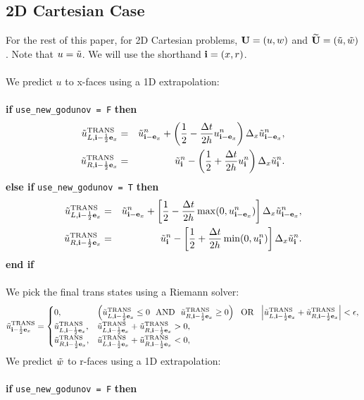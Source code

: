 \subsection{2D Cartesian Case}
For the rest of this paper, for 2D Cartesian problems, ${\bf U} = (u,w)$
and $\widetilde{{\bf U}} = (\tilde{u},\tilde{w})$.  Note that $u = \tilde{u}$.  We will use the 
shorthand ${\bf i} = (x,r)$.\\ \\
We predict $u$ to x-faces using a 1D extrapolation:\\ \\
{\bf if} {\tt use\_new\_godunov = F} {\bf then}
\begin{eqnarray}
\tilde{u}_{L,{\bf i}-\frac{1}{2}{\bf e}_x}^{\rm TRANS} &=& \tilde{u}_{{\bf i}-{\bf e}_x}^n + \left(\frac{1}{2} - \frac{\Delta t}{2h}u_{{\bf i}-{\bf e}_x}^n\right)\Delta_x \tilde{u}_{{\bf i}-{\bf e}_x}^n, \\
\tilde{u}_{R,{\bf i}-\frac{1}{2}{\bf e}_x}^{\rm TRANS} &=& \tilde{u}_{{\bf i}}^n - \left(\frac{1}{2} + \frac{\Delta t}{2h}u_{{\bf i}}^n\right)\Delta_x \tilde{u}_{{\bf i}}^n.
\end{eqnarray}
{\bf else if} {\tt use\_new\_godunov = T} {\bf then}
\begin{eqnarray}
\tilde{u}_{L,{\bf i}-\frac{1}{2}{\bf e}_x}^{\rm TRANS} &=& \tilde{u}_{{\bf i}-{\bf e}_x}^n + \left[\frac{1}{2} - \frac{\Delta t}{2h}\max(0,u_{{\bf i}-{\bf e}_x}^n)\right]\Delta_x \tilde{u}_{{\bf i}-{\bf e}_x}^n, \\
\tilde{u}_{R,{\bf i}-\frac{1}{2}{\bf e}_x}^{\rm TRANS} &=& \tilde{u}_{{\bf i}}^n - \left[\frac{1}{2} + \frac{\Delta t}{2h}\min(0,u_{{\bf i}}^n)\right]\Delta_x \tilde{u}_{{\bf i}}^n.
\end{eqnarray}
{\bf end if}\\ \\
We pick the final trans states using a Riemann solver:
\begin{equation}
\tilde{u}^{\rm TRANS}_{{\bf i}-\frac{1}{2}{\bf e}_x} =
\begin{cases}
0, & \left(\tilde{u}_{L,{\bf i}-\frac{1}{2}{\bf e}_x}^{\rm TRANS} \le 0 ~~ {\rm AND} ~~ \tilde{u}_{R,{\bf i}-\frac{1}{2}{\bf e}_x}^{\rm TRANS} \ge 0\right) ~~ {\rm OR} ~~ \left|\tilde{u}_{L,{\bf i}-\frac{1}{2}{\bf e}_x}^{\rm TRANS} + \tilde{u}_{R,{\bf i}-\frac{1}{2}{\bf e}_x}^{\rm TRANS}\right| < \epsilon, \\
\tilde{u}_{L,{\bf i}-\frac{1}{2}{\bf e}_x}^{\rm TRANS}, & \tilde{u}_{L,{\bf i}-\frac{1}{2}{\bf e}_x}^{\rm TRANS} + \tilde{u}_{R,{\bf i}-\frac{1}{2}{\bf e}_x}^{\rm TRANS} > 0, \\
\tilde{u}_{R,{\bf i}-\frac{1}{2}{\bf e}_x}^{\rm TRANS}, & \tilde{u}_{L,{\bf i}-\frac{1}{2}{\bf e}_x}^{\rm TRANS} + \tilde{u}_{R,{\bf i}-\frac{1}{2}{\bf e}_x}^{\rm TRANS} < 0, \\
\end{cases}
\end{equation}
We predict $\tilde{w}$ to r-faces using a 1D extrapolation:\\ \\
{\bf if} {\tt use\_new\_godunov = F} {\bf then}
